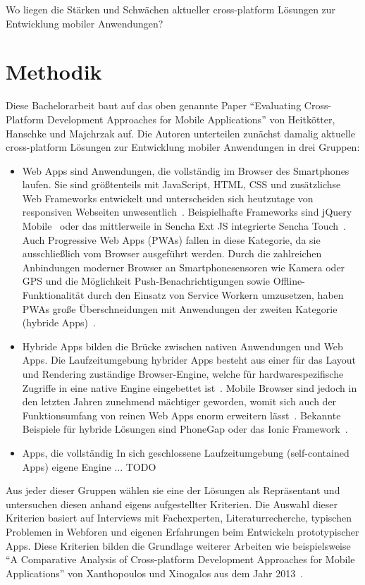 Wo liegen die Stärken und Schwächen aktueller cross-platform Lösungen zur Entwicklung mobiler Anwendungen?

\section*{Methodik}

Diese Bachelorarbeit baut auf das oben genannte Paper “Evaluating Cross-Platform Development Approaches for Mobile Applications” von Heitkötter, Hanschke und Majchrzak auf. Die Autoren unterteilen zunächst damalig aktuelle cross-platform Lösungen zur Entwicklung mobiler Anwendungen in drei Gruppen:
\begin{itemize}
    \item Web Apps sind Anwendungen, die vollständig im Browser des Smartphones laufen. Sie sind größtenteils mit JavaScript, HTML, CSS und zusätzlichse Web Frameworks entwickelt und unterscheiden sich heutzutage von responsiven Webseiten unwesentlich~\cite{eva12}.
    Beispielhafte Frameworks sind jQuery Mobile~\cite{jquery} oder das mittlerweile in Sencha Ext JS integrierte Sencha Touch~\cite{sencha}.
    Auch Progressive Web Apps (PWAs) fallen in diese Kategorie, da sie ausschließlich vom Browser ausgeführt werden.
    Durch die zahlreichen Anbindungen moderner Browser an Smartphonesensoren wie Kamera oder GPS und die Möglichkeit Push-Benachrichtigungen sowie Offline-Funktionalität durch den Einsatz von Service Workern umzusetzen, haben PWAs große Überschneidungen mit Anwendungen der zweiten Kategorie (hybride Apps)~\cite{pwa}.
    
    \item Hybride Apps bilden die Brücke zwischen nativen Anwendungen und Web Apps. Die Laufzeitumgebung hybrider Apps besteht aus einer für das Layout und Rendering zuständige Browser-Engine, welche für hardwarespezifische Zugriffe in eine native Engine eingebettet ist~\cite{eva12}.
    Mobile Browser sind jedoch in den letzten Jahren zunehmend mächtiger geworden, womit sich auch der Funktionsumfang von reinen Web Apps enorm erweitern lässt~\cite{gdev}.
    Bekannte Beispiele für hybride Lösungen sind PhoneGap oder das Ionic Framework~\cite{phonegap,ionic}.
    
    \item Apps, die vollständig In sich geschlossene Laufzeitumgebung (self-contained Apps) eigene Engine ... TODO
\end{itemize}
Aus jeder dieser Gruppen wählen sie eine der Lösungen als Repräsentant und untersuchen diesen anhand eigens aufgestellter Kriterien. Die Auswahl dieser Kriterien basiert auf Interviews mit Fachexperten, Literaturrecherche, typischen Problemen in Webforen und eigenen Erfahrungen beim Entwickeln prototypischer Apps. Diese Kriterien bilden die Grundlage weiterer Arbeiten wie beispielsweise “A Comparative Analysis of Cross-platform Development Approaches for Mobile Applications” von Xanthopoulos und Xinogalos aus dem Jahr 2013~\cite{compa13}.
